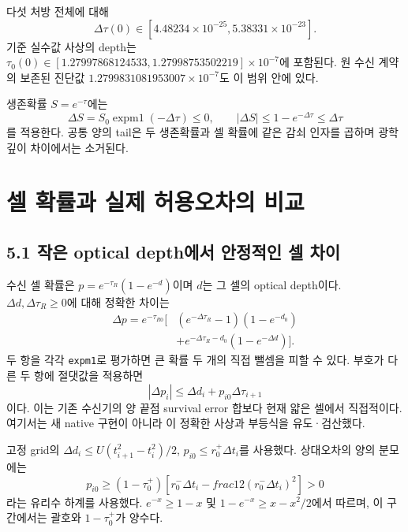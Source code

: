 \documentclass[11pt,a4paper]{article}
\begin{document}
다섯 처방 전체에 대해
\begin{equation}
 \Delta\tau(0)\in[4.48234\times10^{-25},5.38331\times10^{-23}].
\end{equation}
기준 실수값 사상의 depth는
$\tau_0(0)\in[1.27997868124533,1.27998753502219]\times10^{-7}$에 포함된다. 원 수신 계약의 보존된 진단값 $1.2799831081953007\times10^{-7}$도 이 범위 안에 있다.

생존확률 $S=e^{-\tau}$에는
\begin{equation}
 \Delta S=S_0\operatorname{expm1}(-\Delta\tau)\le0,
 \qquad |\Delta S|\le1-e^{-\Delta\tau}\le\Delta\tau
\end{equation}
를 적용한다. 공통 양의 tail은 두 생존확률과 셀 확률에 같은 감쇠 인자를 곱하며 광학깊이 차이에서는 소거된다.

\newpage
\section{셀 확률과 실제 허용오차의 비교}
\subsection*{5.1 작은 optical depth에서 안정적인 셀 차이}
수신 셀 확률은 $p=e^{-\tau_R}(1-e^{-d})$이며 $d$는 그 셀의 optical depth이다. $\Delta d,\Delta\tau_R\ge0$에 대해 정확한 차이는
\begin{align}
 \Delta p=e^{-\tau_{R0}}\big[&(e^{-\Delta\tau_R}-1)(1-e^{-d_0})\nonumber\\
 &+e^{-\Delta\tau_R-d_0}(1-e^{-\Delta d})\big].
\end{align}
두 항을 각각 \texttt{expm1}로 평가하면 큰 확률 두 개의 직접 뺄셈을 피할 수 있다. 부호가 다른 두 항에 절댓값을 적용하면
\begin{equation}\boxed{|\Delta p_i|\le\Delta d_i+p_{i0}\Delta\tau_{i+1}}\end{equation}
이다. 이는 기존 수신기의 양 끝점 survival error 합보다 현재 얇은 셀에서 직접적이다. 여기서는 새 native 구현이 아니라 이 정확한 사상과 부등식을 유도·검산했다.

고정 grid의 $\Delta d_i\le U(t_{i+1}^2-t_i^2)/2$, $p_{i0}\le r_0^+\Delta t_i$를 사용했다. 상대오차의 양의 분모에는
\begin{equation}
 p_{i0}\ge(1-\tau_0^+)\left[r_0^-\Delta t_i-	frac12(r_0^-\Delta t_i)^2\right]>0
\end{equation}
라는 유리수 하계를 사용했다. $e^{-x}\ge1-x$ 및 $1-e^{-x}\ge x-x^2/2$에서 따르며, 이 구간에서는 괄호와 $1-\tau_0^+$가 양수다.
\end{document}
